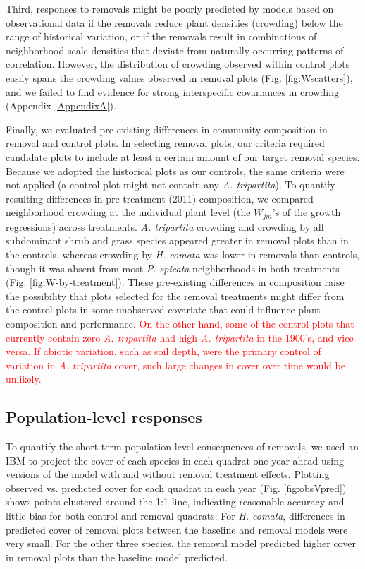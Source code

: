 \documentclass[11pt]{article}
\newcommand{\new}{\textcolor{red}}
\begin{document}
\begin{doublespacing}
Third, responses to removals might be poorly predicted by models based on observational data if the removals reduce plant densities (crowding) below the range of historical variation, or if the removals result in combinations of neighborhood-scale densities that deviate from naturally occurring patterns of correlation. However, the distribution of crowding observed within control plots easily spans the crowding values observed in removal plots (Fig. \ref{fig:Wscatters}), and we failed to find evidence for strong interspecific covariances in crowding (Appendix \ref{AppendixA}).

Finally, we evaluated pre-existing differences in community composition in removal and control plots. In selecting removal plots, our criteria required candidate plots to include at least a certain amount of our target removal species. Because we adopted the historical plots as our controls, the same criteria were not applied (a control plot might not contain any \textit{A. tripartita}). To quantify resulting differences in pre-treatment (2011) composition, we compared neighborhood crowding at the individual plant level (the $W_{jm}$'s of the growth regressions) across treatments. \textit{A. tripartita} crowding and crowding by all subdominant shrub and grass species appeared greater in removal plots than in the controls, whereas crowding by \textit{H. comata} was lower in removals than controls, though it was absent from most \textit{P. spicata} neighborhoods in both treatments (Fig. \ref{fig:W-by-treatment}). These pre-existing differences in composition raise the possibility that plots selected for the removal treatments might differ from the control plots in some unobserved covariate that could influence plant composition and performance. \new{On the other hand, some of the control plots that currently contain zero \textit{A. tripartita} had high \textit{A. tripartita} in the 1900's, and vice versa. If abiotic variation, such as soil depth, were the primary control of variation in \textit{A. tripartita} cover, such large changes in cover over time would be unlikely. }

\subsection*{Population-level responses}

To quantify the short-term population-level consequences of removals, we used an IBM to project the cover of each species in each quadrat one year ahead using versions of the model with and without removal treatment effects. Plotting observed vs. predicted cover for each quadrat in each year (Fig. \ref{fig:obsVpred}) shows points clustered around the 1:1 line, indicating reasonable accuracy and little bias for both control and removal quadrats. For \textit{H. comata}, differences in predicted cover of removal plots between the baseline and removal models were very small. For the other three species, the removal model predicted higher cover in removal plots than the baseline model predicted.


\end{doublespacing}
\end{document}
